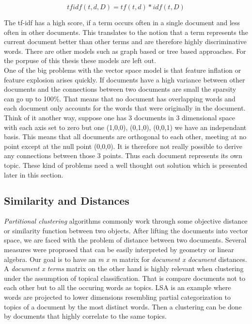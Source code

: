     \begin{equation}
      tfidf(t, d, D) = tf(t, d) * idf(t, D)
    \end{equation}

    The tf-idf has a high score, if a term occurs often in a single document and less often in other documents. This translates to the notion that a term represents the current document better than other terms and are therefore highly discriminative words. There are other models such as graph based or tree based approaches. For the porpuse of this thesis these models are left out. \cite{Nothing}\\

    One of the big problems with the vector space model is that feature inflation or feature explosion arises quickly. If documents have a high variance between other documents and the connections between two documents are small the sparsity can go up to 100\%. That means that no document has overlapping words and each document only accounts for the words that were originally in the document. Think of it another way, suppose one has 3 documents in 3 dimensional space with each axis set to zero but one (1,0,0), (0,1,0), (0,0,1) we have an independant basis. This means that all documents are orthogonal to each other, meeting at no point except at the null point (0,0,0). It is therefore not really possible to derive any connections between those 3 points. Thus each document represents its own topic.
    These kind of problems need a well thought out solution which is presented later in this section.

  \subsection{Similarity and Distances}
    \emph{Partitional clustering} algorithms commonly work through some objective distance or similarity function between two objects. After lifting the documents into vector space, we are faced with the problem of distance between two documents. Several measures were proprosed that can be easily interpreted by geometry or linear algebra. Our goal is to have an \emph{m x m} matrix for \emph{document x document} distances. A \emph{document x terms} matrix on the other hand is highly relevant when clustering under the assumption of topical classification. That is compare documents not to each other but to all the occuring words as topics. LSA is an example where words are projected to lower dimensions resembling partial categorization to topics of a document by the most distinct words. Then a clustering can be done by documents that highly correlate to the same topics.

